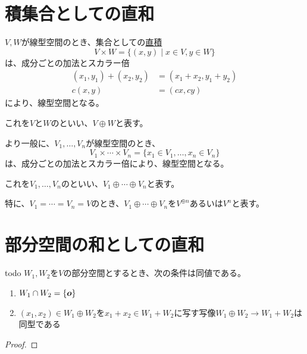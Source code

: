 \documentclass[../../../topic_linear-algebra]{subfiles}
\begin{document}
\sectionline
\section{積集合としての直和}

$V, W$が線型空間のとき、集合としての\hyperref[def:cartesian-product]{直積}
\begin{equation*}
  V \times W = \{ (x, y) \mid x \in V, y \in W \}
\end{equation*}
は、成分ごとの加法とスカラー倍
\begin{align*}
  (x_1, y_1) + (x_2, y_2) &= (x_1 + x_2, y_1 + y_2) \\
  c (x, y) &= (c x, c y)
\end{align*}
により、線型空間となる。

これを$V$と$W$のといい、$V \oplus W$と表す。

\br

より一般に、$V_1, \ldots, V_n$が線型空間のとき、
\begin{equation*}
  V_1 \times \cdots \times V_n = \{ x_1 \in V_1, \ldots, x_n \in V_n \}
\end{equation*}
は、成分ごとの加法とスカラー倍により、線型空間となる。

これを$V_1, \ldots, V_n$のといい、$V_1 \oplus \cdots \oplus V_n$と表す。

\br

特に、$V_1 = \cdots = V_n = V$のとき、$V_1 \oplus \cdots \oplus V_n$を$V^{\oplus n}$あるいは$V^n$と表す。

\sectionline
\section{部分空間の和としての直和}

\begin{theorem}{todo}
  $W_1, W_2$を$V$の部分空間とするとき、次の条件は同値である。
  \begin{enumerate}[label=\romanlabel]
    \item $W_1 \cap W_2 = \{ \vb*{o} \}$
    \item $(x_1, x_2) \in W_1 \oplus W_2$を$x_1 + x_2 \in W_1 + W_2$に写す写像$W_1 \oplus W_2 \to W_1 + W_2$は同型である
  \end{enumerate}
\end{theorem}

\begin{proof}
\end{proof}
\end{document}
